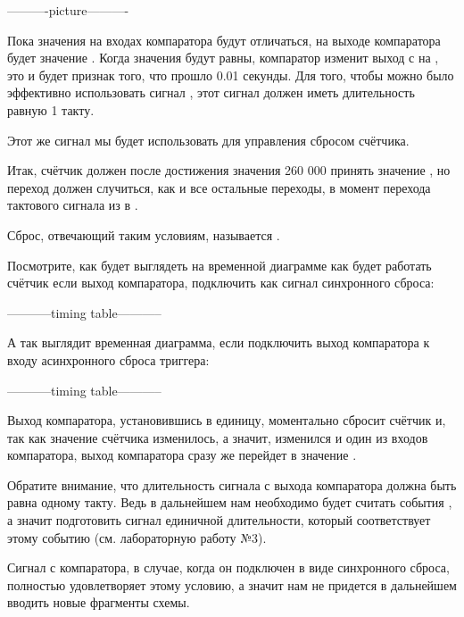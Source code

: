 \par{----------picture----------}

\par{Пока значения на входах компаратора будут отличаться, на выходе компаратора будет значение . Когда значения будут равны, компаратор изменит выход с  на , это и будет признак того, что прошло 0.01 секунды. Для того, чтобы можно было эффективно использовать сигнал , этот сигнал должен иметь длительность равную 1 такту.}

\par{Этот же сигнал мы будет использовать для управления сбросом счётчика.}

\par{Итак, счётчик должен после достижения значения 260 000 принять значение , но переход должен случиться, как и все остальные переходы, в момент перехода тактового сигнала из  в .}

\par{Сброс, отвечающий таким условиям, называется .}

\par{Посмотрите, как будет выглядеть на временной диаграмме как будет работать счётчик если выход компаратора, подключить как сигнал синхронного сброса:}

\par{-----------timing table-----------}

\par{А так выглядит временная диаграмма, если подключить выход компаратора к входу асинхронного сброса триггера:}

\par{-----------timing table-----------}

\par{Выход компаратора, установившись в единицу, моментально сбросит счётчик и, так как значение счётчика изменилось, а значит, изменился и один из входов компаратора, выход компаратора сразу же перейдет в значение .}

\par{Обратите внимание, что длительность сигнала с выхода компаратора должна быть равна одному такту. Ведь в дальнейшем нам необходимо будет считать события , а значит подготовить сигнал единичной длительности, который соответствует этому событию (см. лабораторную работу №3).}

\par{Сигнал с компаратора, в случае, когда он подключен в виде синхронного сброса, полностью удовлетворяет этому условию, а значит нам не придется в дальнейшем вводить новые фрагменты схемы.}

